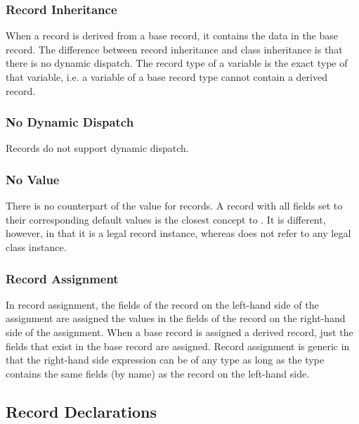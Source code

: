 \subsubsection{Record Inheritance}
\label{Record_Inheritance}

When a record is derived from a base record, it contains the data in
the base record.  The difference between record inheritance and class
inheritance is that there is no dynamic dispatch.  The record type of
a variable is the exact type of that variable, i.e. a variable of a
base record type cannot contain a derived record.

\subsubsection{No Dynamic Dispatch}

Records do not support dynamic dispatch.

\subsubsection{No  Value}

There is no counterpart of the  value for records.  A record
with all fields set to their corresponding default values is the
closest concept to . It is different, however, in that it is
a legal record instance, whereas  does not refer to any
legal class instance.

\subsubsection{Record Assignment}
\label{Record_Assignment}

In record assignment, the fields of the record on the left-hand side
of the assignment are assigned the values in the fields of the record
on the right-hand side of the assignment.  When a base record is
assigned a derived record, just the fields that exist in the base
record are assigned.  Record assignment is generic in that the
right-hand side expression can be of any type as long as the type
contains the same fields (by name) as the record on the left-hand
side.

\subsection{Record Declarations}
\label{Record_Declarations}

